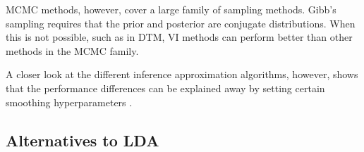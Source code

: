 \documentclass[letterpaper]{article}
\begin{document}
MCMC methods, however, cover a large family of sampling methods.
Gibb's sampling requires that the prior and posterior are conjugate
distributions. When this is not possible, such as in DTM, VI methods
can perform better than other methods in the MCMC family.

A closer look at the different inference approximation algorithms,
however, shows that the performance differences can be explained away
by setting certain smoothing hyperparameters
\citep{asuncion-2012-smoot-infer}.

\subsection{Alternatives to LDA}


\end{document}
